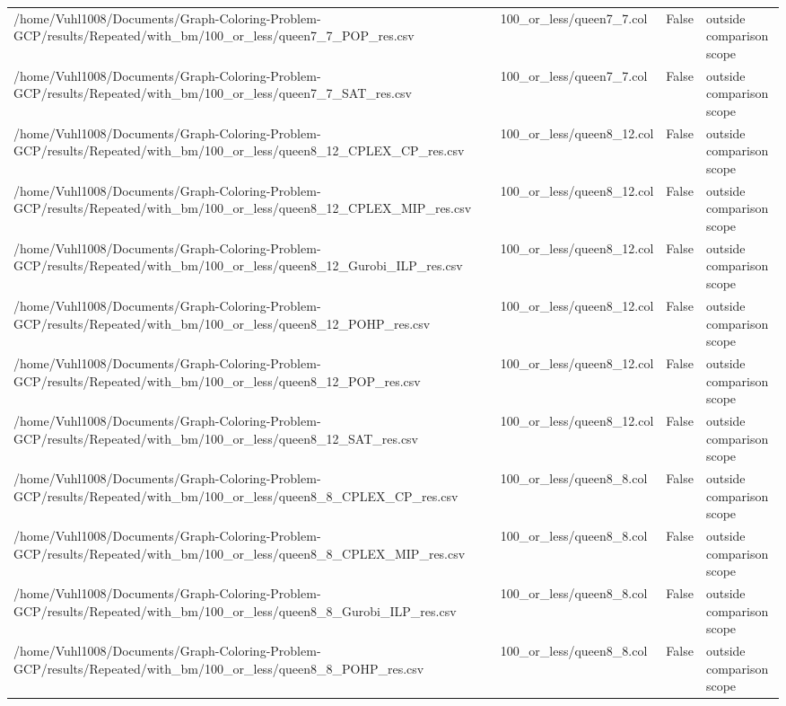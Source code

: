 \begin{table}[htbp]
\begin{tabular}{llll}
/home/Vuhl1008/Documents/Graph-Coloring-Problem-GCP/results/Repeated/with\_bm/100\_or\_less/queen7\_7\_POP\_res.csv & 100\_or\_less/queen7\_7.col & False & outside comparison scope \\
/home/Vuhl1008/Documents/Graph-Coloring-Problem-GCP/results/Repeated/with\_bm/100\_or\_less/queen7\_7\_SAT\_res.csv & 100\_or\_less/queen7\_7.col & False & outside comparison scope \\
/home/Vuhl1008/Documents/Graph-Coloring-Problem-GCP/results/Repeated/with\_bm/100\_or\_less/queen8\_12\_CPLEX\_CP\_res.csv & 100\_or\_less/queen8\_12.col & False & outside comparison scope \\
/home/Vuhl1008/Documents/Graph-Coloring-Problem-GCP/results/Repeated/with\_bm/100\_or\_less/queen8\_12\_CPLEX\_MIP\_res.csv & 100\_or\_less/queen8\_12.col & False & outside comparison scope \\
/home/Vuhl1008/Documents/Graph-Coloring-Problem-GCP/results/Repeated/with\_bm/100\_or\_less/queen8\_12\_Gurobi\_ILP\_res.csv & 100\_or\_less/queen8\_12.col & False & outside comparison scope \\
/home/Vuhl1008/Documents/Graph-Coloring-Problem-GCP/results/Repeated/with\_bm/100\_or\_less/queen8\_12\_POHP\_res.csv & 100\_or\_less/queen8\_12.col & False & outside comparison scope \\
/home/Vuhl1008/Documents/Graph-Coloring-Problem-GCP/results/Repeated/with\_bm/100\_or\_less/queen8\_12\_POP\_res.csv & 100\_or\_less/queen8\_12.col & False & outside comparison scope \\
/home/Vuhl1008/Documents/Graph-Coloring-Problem-GCP/results/Repeated/with\_bm/100\_or\_less/queen8\_12\_SAT\_res.csv & 100\_or\_less/queen8\_12.col & False & outside comparison scope \\
/home/Vuhl1008/Documents/Graph-Coloring-Problem-GCP/results/Repeated/with\_bm/100\_or\_less/queen8\_8\_CPLEX\_CP\_res.csv & 100\_or\_less/queen8\_8.col & False & outside comparison scope \\
/home/Vuhl1008/Documents/Graph-Coloring-Problem-GCP/results/Repeated/with\_bm/100\_or\_less/queen8\_8\_CPLEX\_MIP\_res.csv & 100\_or\_less/queen8\_8.col & False & outside comparison scope \\
/home/Vuhl1008/Documents/Graph-Coloring-Problem-GCP/results/Repeated/with\_bm/100\_or\_less/queen8\_8\_Gurobi\_ILP\_res.csv & 100\_or\_less/queen8\_8.col & False & outside comparison scope \\
/home/Vuhl1008/Documents/Graph-Coloring-Problem-GCP/results/Repeated/with\_bm/100\_or\_less/queen8\_8\_POHP\_res.csv & 100\_or\_less/queen8\_8.col & False & outside comparison scope \\

\end{tabular}
\end{table}
